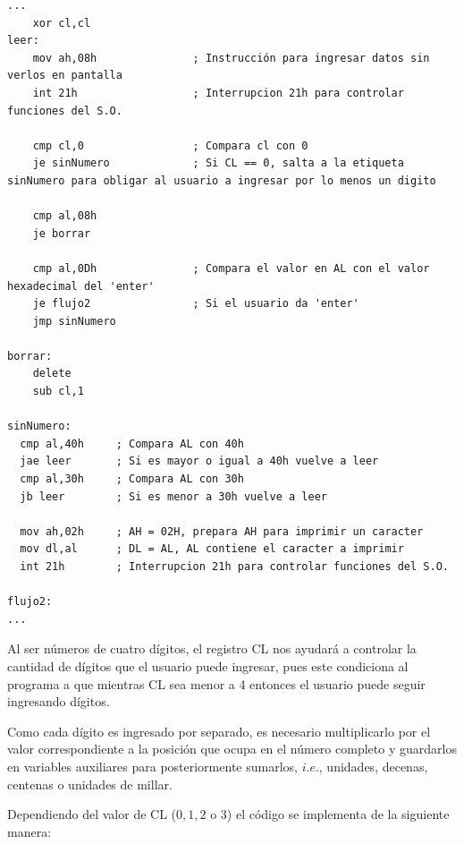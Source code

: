 \documentclass[letter,12 pt,titlepage]{article}
\begin{document}
    \begin{verbatim}
...
    xor cl,cl
leer:
    mov ah,08h               ; Instrucción para ingresar datos sin verlos en pantalla
    int 21h                  ; Interrupcion 21h para controlar funciones del S.O.

    cmp cl,0                 ; Compara cl con 0
    je sinNumero             ; Si CL == 0, salta a la etiqueta sinNumero para obligar al usuario a ingresar por lo menos un digito

    cmp al,08h
    je borrar

    cmp al,0Dh               ; Compara el valor en AL con el valor hexadecimal del 'enter'
    je flujo2                ; Si el usuario da 'enter'
    jmp sinNumero

borrar:
    delete
    sub cl,1

sinNumero:
  cmp al,40h     ; Compara AL con 40h
  jae leer       ; Si es mayor o igual a 40h vuelve a leer
  cmp al,30h     ; Compara AL con 30h
  jb leer        ; Si es menor a 30h vuelve a leer

  mov ah,02h     ; AH = 02H, prepara AH para imprimir un caracter
  mov dl,al      ; DL = AL, AL contiene el caracter a imprimir
  int 21h        ; Interrupcion 21h para controlar funciones del S.O.

flujo2:
...
    \end{verbatim}

    Al ser números de cuatro dígitos, el registro CL nos ayudará a controlar la cantidad de dígitos que el usuario puede ingresar, pues este condiciona al programa a que mientras CL sea menor a 4 entonces el usuario puede seguir ingresando dígitos.

    Como cada dígito es ingresado por separado, es necesario multiplicarlo por el valor correspondiente a la posición que ocupa en el número completo y guardarlos en variables auxiliares para posteriormente sumarlos, $i.e.$, unidades, decenas, centenas o unidades de millar.

    Dependiendo del valor de CL ($0, 1, 2$ o $3$) el código se implementa de la siguiente manera:
\end{document}
